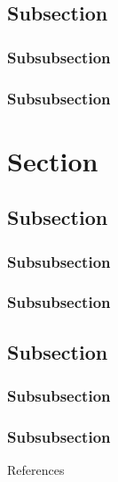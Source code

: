 \documentclass[
11pt,notheorems,hyperref={pdfauthor=whatever}
]{beamer}
\begin{document}
\subsection{Subsection}
\subsubsection{Subsubsection}
\subsubsection{Subsubsection}
\section{Section}
\subsection{Subsection}
\subsubsection{Subsubsection}
\subsubsection{Subsubsection}
\subsection{Subsection}
\subsubsection{Subsubsection}
\subsubsection{Subsubsection}

\begin{frame}[allowframebreaks]{References}
    \printbibliography
\end{frame}
\end{document}
